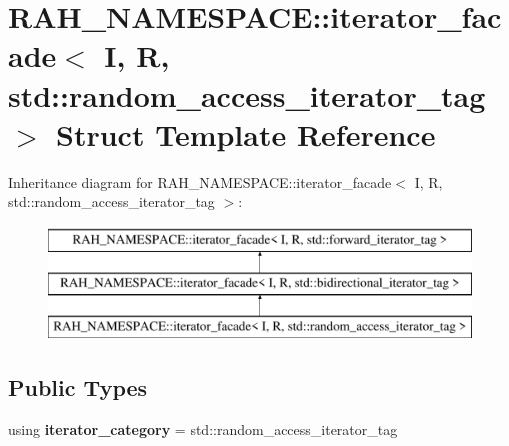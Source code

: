 \hypertarget{struct_r_a_h___n_a_m_e_s_p_a_c_e_1_1iterator__facade_3_01_i_00_01_r_00_01std_1_1random__access__iterator__tag_01_4}{}\section{R\+A\+H\+\_\+\+N\+A\+M\+E\+S\+P\+A\+CE\+::iterator\+\_\+facade$<$ I, R, std\+::random\+\_\+access\+\_\+iterator\+\_\+tag $>$ Struct Template Reference}
\label{struct_r_a_h___n_a_m_e_s_p_a_c_e_1_1iterator__facade_3_01_i_00_01_r_00_01std_1_1random__access__iterator__tag_01_4}
Inheritance diagram for R\+A\+H\+\_\+\+N\+A\+M\+E\+S\+P\+A\+CE\+::iterator\+\_\+facade$<$ I, R, std\+::random\+\_\+access\+\_\+iterator\+\_\+tag $>$\+:\begin{figure}[H]
\begin{center}
\leavevmode
\includegraphics[height=3.000000cm]{struct_r_a_h___n_a_m_e_s_p_a_c_e_1_1iterator__facade_3_01_i_00_01_r_00_01std_1_1random__access__iterator__tag_01_4}
\end{center}
\end{figure}
\subsection*{Public Types}
\begin{DoxyCompactItemize}
\item 
\mbox{\label{struct_r_a_h___n_a_m_e_s_p_a_c_e_1_1iterator__facade_3_01_i_00_01_r_00_01std_1_1random__access__iterator__tag_01_4_a4fa7b515e853787a85b5ec008b1bb577}} 
using {\bfseries iterator\+\_\+category} = std\+::random\+\_\+access\+\_\+iterator\+\_\+tag
\end{DoxyCompactItemize}
